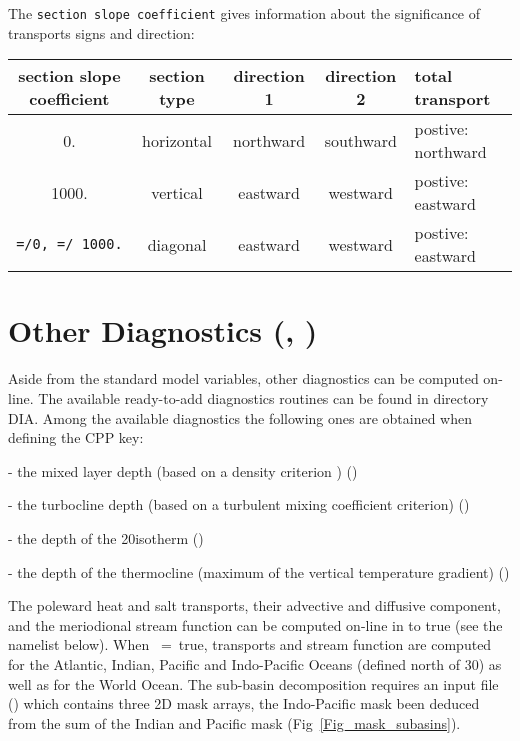 \documentclass[NEMO_book]{subfiles}
\begin{document}
\noindent The \texttt{section slope coefficient} gives information about the significance of transports signs and direction:\\



\begin{tabular}{|c|c|c|c|p{4cm}|}
\hline
section slope coefficient & section type & direction 1 & direction 2 & total transport \\ \hline
0.    &  horizontal & northward & southward & postive: northward  \\ \hline
1000. &  vertical   & eastward  & westward  & postive: eastward  \\ \hline                
\texttt{=/0, =/ 1000.}   &  diagonal   & eastward  & westward  & postive: eastward  \\ \hline                
\end{tabular}



\section{Other Diagnostics (, )}
\label{DIA_diag_others}


Aside from the standard model variables, other diagnostics can be computed 
on-line. The available ready-to-add diagnostics routines can be found in directory DIA. 
Among the available diagnostics the following ones are obtained when defining 
the  CPP key: 

- the mixed layer depth (based on a density criterion \citep{de_Boyer_Montegut_al_JGR04}) ()

- the turbocline depth (based on a turbulent mixing coefficient criterion) ()

- the depth of the 20\degC isotherm ()

- the depth of the thermocline (maximum of the vertical temperature gradient) ()

The poleward heat and salt transports, their advective and diffusive component, and 
the meriodional stream function can be computed on-line in  
 to true (see the \textit{ } namelist below).  
When ~=~true, transports and stream function are computed 
for the Atlantic, Indian, Pacific and Indo-Pacific Oceans (defined north of 30\degS) 
as well as for the World Ocean. The sub-basin decomposition requires an input file 
() which contains three 2D mask arrays, the Indo-Pacific mask 
been deduced from the sum of the Indian and Pacific mask (Fig~\ref{Fig_mask_subasins}). 
\end{document}
